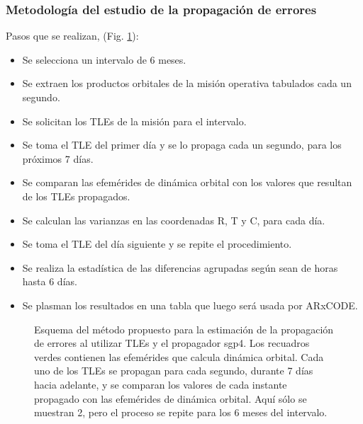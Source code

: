\subsubsection*{Metodolog\'ia del estudio de la propagaci\'on de errores}
Pasos que se realizan, (Fig. \ref{fig:metodotabla}):
\begin{itemize}
\itemsep0em
\item Se selecciona un intervalo de 6 meses.
\item Se extraen los productos orbitales de la misi\'on operativa tabulados cada un segundo.
\item Se solicitan los TLEs de la misi\'on para el intervalo.
\item Se toma el TLE del primer d\'ia y se lo propaga cada un segundo, para los pr\'oximos 7 d\'ias.
\item Se comparan las efem\'erides de din\'amica orbital con los valores que resultan de los TLEs propagados.
\item Se calculan las varianzas en las coordenadas R, T y C, para cada d\'ia.
\item Se toma el TLE del d\'ia siguiente y se repite el procedimiento.
\item Se realiza la estad\'istica  de las diferencias agrupadas seg\'un sean de horas hasta 6 d\'ias.
\item Se plasman los resultados en una tabla que luego ser\'a usada por ARxCODE.
\end{itemize}

\begin{figure}[!h]
\centering
{}
\caption[Descripci\'on del m\'etodo propuesto para la propagaci\'on de errores]{Esquema del m\'etodo propuesto para la estimaci\'on de la propagaci\'on de errores al utilizar TLEs y el propagador sgp4. Los recuadros verdes contienen las efem\'erides que calcula din\'amica orbital. Cada uno de los TLEs se propagan para cada segundo, durante 7 d\'ias hacia adelante, y se comparan los valores de cada instante propagado con las efem\'erides de din\'amica orbital. Aqu\'i s\'olo se muestran 2, pero el proceso se repite para los 6 meses del intervalo.}
\label{fig:metodotabla}
\end{figure}

